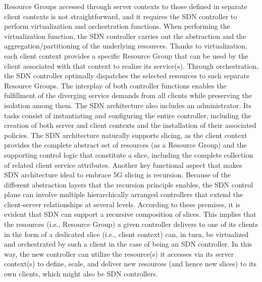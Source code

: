 \documentclass{article}
\begin{document}
Resource Groups accessed through server contexts to those defined in separate client contexts
is not straightforward, and it requires the SDN
controller to perform virtualization and orchestration functions.
When performing the virtualization function, the
SDN controller carries out the abstraction and the
aggregation/partitioning of the underlying resources. Thanks to virtualization, each client context provides a specific Resource Group that can be used by the client associated with that context to realize
its service(s). Through orchestration, the SDN controller optimally dispatches the selected resources
to such separate Resource Groups. The interplay
of both controller functions enables the fulfillment
of the diverging service demands from all clients
while preserving the isolation among them.
The SDN architecture also includes an administrator. Its tasks consist of instantiating and configuring the entire controller, including the creation
of both server and client contexts and the installation of their associated policies.
The SDN architecture naturally supports slicing, as the client context provides the complete abstract set of resources
(as a Resource Group) and the supporting control
logic that constitute a slice, including the complete
collection of related client service attributes.
Another key functional aspect that makes SDN
architecture ideal to embrace 5G slicing is recursion. Because of the different abstraction layers
that the recursion principle enables, the SDN
control plane can involve multiple hierarchically
arranged controllers that extend the client-server
relationships at several levels. According to
these premises, it is evident that SDN can support a
recursive composition of slices. This implies that
the resources (i.e., Resource Group) a given controller delivers to one of its clients in the form of a
dedicated slice (i.e., client context) can, in turn, be
virtualized and orchestrated by such a client in the
case of being an SDN controller. In this way, the new
controller can utilize the resource(s) it accesses via
its server context(s) to define, scale, and deliver
new resources (and hence new slices) to its own
clients, which might also be SDN controllers.
\end{document}
